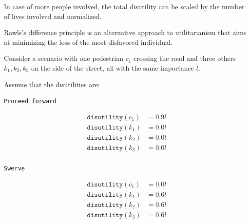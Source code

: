 \begin{description}
        \begin{remark}
            In case of more people involved, the total disutility can be scaled by the number of lives involved and normalized.
        \end{remark}

        \begin{remark} 
            Rawls's difference principle is an alternative approach to utilitarianism that aims at minimizing the loss of the most disfavored individual.
            
            \indenttbox
            \begin{example}
                Consider a scenario with one pedestrian $c_1$ crossing the road and three others $k_1, k_2, k_3$ on the side of the street, all with the same importance $l$.

                Assume that the disutilities are:\\[1em]
                \begin{minipage}{0.48\linewidth}
                    \begin{center}
                        \texttt{Proceed forward}
                    \end{center}
                    \[
                        \begin{split}
                            \texttt{disutility}(c_1) &= 0.9 l \\
                            \texttt{disutility}(k_1) &= 0.0 l \\
                            \texttt{disutility}(k_2) &= 0.0 l \\
                            \texttt{disutility}(k_3) &= 0.0 l \\
                        \end{split}
                    \]                    
                \end{minipage}
                \hfill
                \begin{minipage}{0.48\linewidth}
                    \begin{center}
                        \texttt{Swerve}
                    \end{center}
                    \[
                        \begin{split}
                            \texttt{disutility}(c_1) &= 0.0 l \\
                            \texttt{disutility}(k_1) &= 0.6 l \\
                            \texttt{disutility}(k_2) &= 0.6 l \\
                            \texttt{disutility}(k_3) &= 0.6 l \\
                        \end{split}
                    \]         
                \end{minipage}\\[0.5em]


\end{example}
\end{remark}
\end{description}
